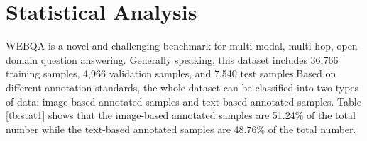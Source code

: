 \documentclass[nohyperref]{article}
\theoremstyle{plain}
\theoremstyle{definition}
\theoremstyle{remark}
\begin{document}






    \section{Statistical Analysis}\label{intro}
    WEBQA \cite{webqa} is a novel and challenging benchmark for multi-modal, multi-hop, open-domain question answering. Generally speaking, this dataset includes 36,766 training samples,  4,966 validation samples, and 7,540 test samples.Based on different annotation standards, the whole dataset can be classified into two types of data: image-based annotated samples and text-based annotated samples. Table \ref{tb:stat1} shows that the image-based annotated samples are 51.24\% of the total number while the text-based annotated samples are 48.76\% of the total number.
\end{document}
